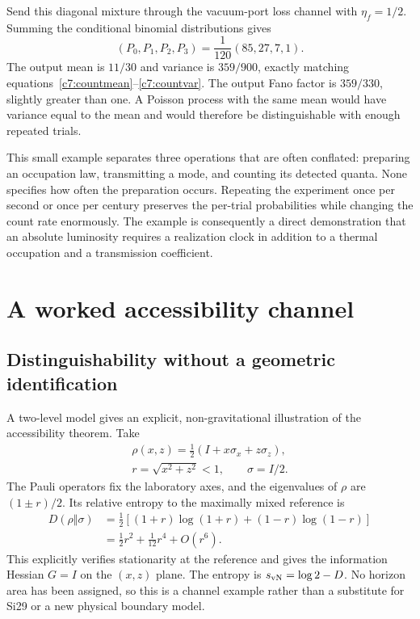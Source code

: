 Send this diagonal mixture through the vacuum-port loss channel with $\eta_f=1/2$. Summing the conditional binomial distributions gives
\begin{equation}
 (P_0,P_1,P_2,P_3)=\frac1{120}(85,27,7,1).
 \label{c7:countoutput}
\end{equation}
The output mean is $11/30$ and variance is $359/900$, exactly matching equations~\eqref{c7:countmean}--\eqref{c7:countvar}. The output Fano factor is $359/330$, slightly greater than one. A Poisson process with the same mean would have variance equal to the mean and would therefore be distinguishable with enough repeated trials.

This small example separates three operations that are often conflated: preparing an occupation law, transmitting a mode, and counting its detected quanta. None specifies how often the preparation occurs. Repeating the experiment once per second or once per century preserves the per-trial probabilities while changing the count rate enormously. The example is consequently a direct demonstration that an absolute luminosity requires a realization clock in addition to a thermal occupation and a transmission coefficient.

\section{A worked accessibility channel}
\subsection{Distinguishability without a geometric identification}
A two-level model gives an explicit, non-gravitational illustration of the accessibility theorem. Take
\begin{equation}
 \begin{gathered}
 \rho(x,z)=\frac12(I+x\sigma_x+z\sigma_z),\\
 r=\sqrt{x^2+z^2}<1,\qquad \sigma=I/2.
 \end{gathered}
 \label{c7:qubit}
\end{equation}
The Pauli operators fix the laboratory axes, and the eigenvalues of $\rho$ are $(1\pm r)/2$. Its relative entropy to the maximally mixed reference is
\begin{equation}
 \begin{aligned}
 D(\rho\Vert\sigma)
 &=\tfrac12[(1+r)\log(1+r)+(1-r)\log(1-r)]\\
 &=\tfrac12r^2+\tfrac1{12}r^4+O(r^6).
 \end{aligned}
 \label{c7:qubitD}
\end{equation}
This explicitly verifies stationarity at the reference and gives the information Hessian $G=I$ on the $(x,z)$ plane. The entropy is $s_{\rm vN}=\log2-D$. No horizon area has been assigned, so this is a channel example rather than a substitute for Si29 or a new physical boundary model.


